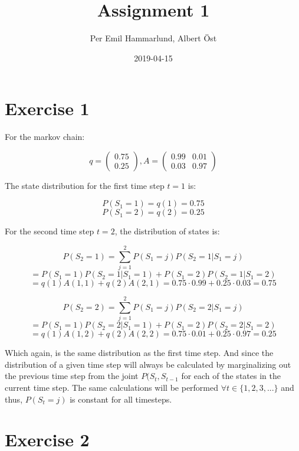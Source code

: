\documentclass[]{article}
\title{Assignment 1}
\author{Per Emil Hammarlund, Albert Öst}
\date{2019-04-15}
\begin{document}
\maketitle

\tableofcontents

\newpage

\hypertarget{exercise-1}{%
\section{Exercise 1}\label{exercise-1}}

For the markov chain:

\[q = \begin{pmatrix} 0.75 \\ 0.25 \end{pmatrix}, A = \begin{pmatrix} 0.99 & 0.01 \\ 0.03 & 0.97\end{pmatrix}\]

The state distribution for the first time step \(t = 1\) is:

\[P(S_1 = 1) = q(1) = 0.75\] \[P(S_1 = 2) = q(2) = 0.25\]

For the second time step \(t = 2\), the distribution of states is:

\[P(S_2 = 1) = \sum_{j = 1}^{2} P(S_1 = j) P(S_2 = 1 | S_1 = j)\]
\[= P(S_1 = 1) P(S_2 = 1 | S_1 = 1) + P(S_1 = 2) P(S_2 = 1 | S_1 = 2)\]
\[= q(1) A(1, 1) + q(2) A(2, 1)  = 0.75 \cdot 0.99 + 0.25 \cdot 0.03 = 0.75\]

\[P(S_2 = 2) = \sum_{j = 1}^{2} P(S_1 = j) P(S_2 = 2 | S_1 = j)\]
\[= P(S_1 = 1) P(S_2 = 2 | S_1 = 1) + P(S_1 = 2) P(S_2 = 2 | S_1 = 2)\]
\[= q(1) A(1, 2) + q(2) A(2, 2) = 0.75 \cdot 0.01 + 0.25 \cdot 0.97 = 0.25\]

Which again, is the same distribution as the first time step. And since
the distribution of a given time step will always be calculated by
marginalizing out the previous time step from the joint
\(P(S_t, S_{t - 1}\) for each of the states in the current time step.
The same calculations will be performed
\(\forall t \in \{ 1, 2, 3, ... \}\) and thus, \(P(S_t = j)\) is
constant for all timesteps.

\newpage

\hypertarget{exercise-2}{%
\section{Exercise 2}\label{exercise-2}}
\end{document}
